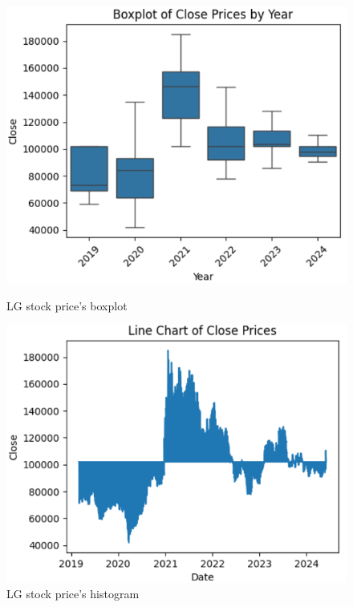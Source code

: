\documentclass{article}
\begin{document}
\begin{multicols}{2}
\begin{figure}[H]
    \centering
    \begin{minipage}{0.23\textwidth}
    \centering
    \includegraphics[width=1\textwidth]{Image/DatasetImg/LG_Boxplot.png}
    \caption{LG stock price's boxplot}
    \label{fig:1}
    \end{minipage}
    \hfill
    \begin{minipage}{0.23\textwidth}
    \centering
    \includegraphics[width=1\textwidth]{Image/DatasetImg/LG_LineChart.png}
    \caption{LG stock price's histogram}
    \label{fig:2}
    \end{minipage}
\end{figure}



\end{multicols}
\end{document}
